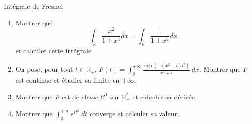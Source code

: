\documentclass[french,a4paper]{article}
\newcommand{\R}{\mathbb{R}}
\newcommand{\st}{^*}
\theoremstyle{plain}
\theoremstyle{definition}
\theoremstyle{remark}
\begin{document}
\begin{ex}[Châteaux]{Intégrale de Fresnel}
	\begin{enumerate}
		\item Montrer que $$\int_\R\frac{x^2}{1+x^4}dx=\int_\R\frac{1}{1+x^4}dx$$ et calculer cette intégrale.
		\item On pose, pour tout $t\in\R_+$, $F(t)=\displaystyle\int_{0}^{+\infty}\frac{\exp(-(x^2+i)t^2)}{x^2+i}\ dx$. Montrer que $F$ est continue et étudier sa limite en $+\infty$.
		\item Montrer que $F$ est de classe $\mathcal{C}^1$ sur $\R_+\st$ et calculer sa dérivée.
		\item Montrer que $\displaystyle\int_{0}^{+\infty}e^{it^2}\ dt$ converge et calculer sa valeur.
	\end{enumerate}
\end{ex}
\end{document}
